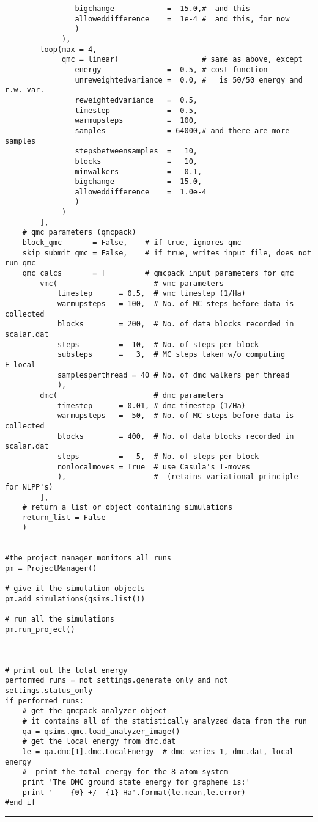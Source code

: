 \documentclass[oneside,11pt]{memoir}
\numberwithin{equation}{section}
\newcommand{\HRule}{\rule{\linewidth}{0.5mm}}
\begin{document}
\begin{verbatim}
                bigchange            =  15.0,#  and this
                alloweddifference    =  1e-4 #  and this, for now
                )
             ),
        loop(max = 4,
             qmc = linear(                   # same as above, except
                energy               =  0.5, # cost function
                unreweightedvariance =  0.0, #   is 50/50 energy and r.w. var.
                reweightedvariance   =  0.5, 
                timestep             =  0.5,  
                warmupsteps          =  100, 
                samples              = 64000,# and there are more samples 
                stepsbetweensamples  =   10, 
                blocks               =   10,   
                minwalkers           =   0.1, 
                bigchange            =  15.0,
                alloweddifference    =  1.0e-4
                )
             )
        ],
    # qmc parameters (qmcpack)
    block_qmc       = False,    # if true, ignores qmc
    skip_submit_qmc = False,    # if true, writes input file, does not run qmc
    qmc_calcs       = [         # qmcpack input parameters for qmc
        vmc(                      # vmc parameters 
            timestep      = 0.5,  # vmc timestep (1/Ha)
            warmupsteps   = 100,  # No. of MC steps before data is collected
            blocks        = 200,  # No. of data blocks recorded in scalar.dat
            steps         =  10,  # No. of steps per block
            substeps      =   3,  # MC steps taken w/o computing E_local
            samplesperthread = 40 # No. of dmc walkers per thread
            ),                    
        dmc(                      # dmc parameters
            timestep      = 0.01, # dmc timestep (1/Ha)
            warmupsteps   =  50,  # No. of MC steps before data is collected
            blocks        = 400,  # No. of data blocks recorded in scalar.dat
            steps         =   5,  # No. of steps per block
            nonlocalmoves = True  # use Casula's T-moves
            ),                    #  (retains variational principle for NLPP's)
        ],
    # return a list or object containing simulations
    return_list = False
    )


#the project manager monitors all runs
pm = ProjectManager()  

# give it the simulation objects
pm.add_simulations(qsims.list()) 

# run all the simulations    
pm.run_project()  



# print out the total energy
performed_runs = not settings.generate_only and not settings.status_only
if performed_runs:
    # get the qmcpack analyzer object
    # it contains all of the statistically analyzed data from the run
    qa = qsims.qmc.load_analyzer_image()
    # get the local energy from dmc.dat
    le = qa.dmc[1].dmc.LocalEnergy  # dmc series 1, dmc.dat, local energy
    #  print the total energy for the 8 atom system
    print 'The DMC ground state energy for graphene is:'
    print '    {0} +/- {1} Ha'.format(le.mean,le.error)
#end if
\end{verbatim}
\HRule
\end{document}
